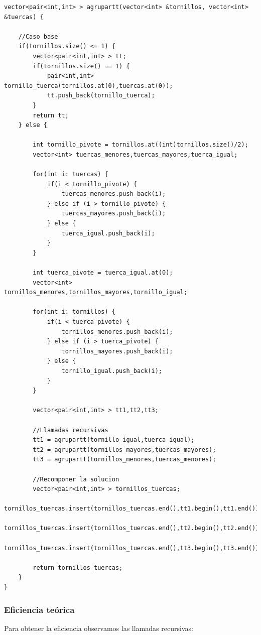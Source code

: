\begin{lstlisting}
vector<pair<int,int> > agrupartt(vector<int> &tornillos, vector<int> &tuercas) {

    //Caso base
    if(tornillos.size() <= 1) {
        vector<pair<int,int> > tt;
        if(tornillos.size() == 1) {
            pair<int,int> tornillo_tuerca(tornillos.at(0),tuercas.at(0));
            tt.push_back(tornillo_tuerca);
        }
        return tt;
    } else {

        int tornillo_pivote = tornillos.at((int)tornillos.size()/2);
        vector<int> tuercas_menores,tuercas_mayores,tuerca_igual;

        for(int i: tuercas) {
            if(i < tornillo_pivote) {
                tuercas_menores.push_back(i);
            } else if (i > tornillo_pivote) {
                tuercas_mayores.push_back(i);
            } else {
                tuerca_igual.push_back(i);
            }
        }

        int tuerca_pivote = tuerca_igual.at(0);
        vector<int> tornillos_menores,tornillos_mayores,tornillo_igual;

        for(int i: tornillos) {
            if(i < tuerca_pivote) {
                tornillos_menores.push_back(i);
            } else if (i > tuerca_pivote) {
                tornillos_mayores.push_back(i);
            } else {
                tornillo_igual.push_back(i);
            }
        }

        vector<pair<int,int> > tt1,tt2,tt3;

        //Llamadas recursivas
        tt1 = agrupartt(tornillo_igual,tuerca_igual);
        tt2 = agrupartt(tornillos_mayores,tuercas_mayores);
        tt3 = agrupartt(tornillos_menores,tuercas_menores);

        //Recomponer la solucion
        vector<pair<int,int> > tornillos_tuercas;
        tornillos_tuercas.insert(tornillos_tuercas.end(),tt1.begin(),tt1.end());
        tornillos_tuercas.insert(tornillos_tuercas.end(),tt2.begin(),tt2.end());
        tornillos_tuercas.insert(tornillos_tuercas.end(),tt3.begin(),tt3.end());

        return tornillos_tuercas;
    }
}
\end{lstlisting}


\subsubsection{Eficiencia teórica}

Para obtener la eficiencia observamos las llamadas recursivas:

